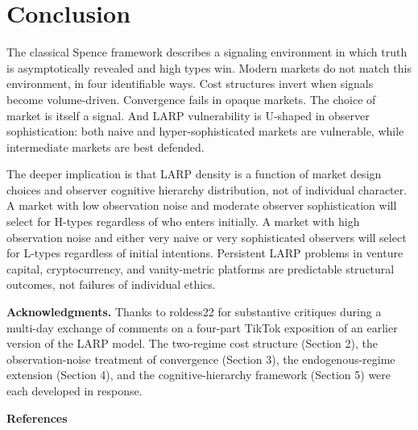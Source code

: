 \documentclass[11pt]{article}
\begin{document}
\section{Conclusion}

The classical Spence framework describes a signaling environment in which truth is asymptotically revealed and high types win. Modern markets do not match this environment, in four identifiable ways. Cost structures invert when signals become volume-driven. Convergence fails in opaque markets. The choice of market is itself a signal. And LARP vulnerability is U-shaped in observer sophistication: both naive and hyper-sophisticated markets are vulnerable, while intermediate markets are best defended.

The deeper implication is that LARP density is a function of market design choices and observer cognitive hierarchy distribution, not of individual character. A market with low observation noise and moderate observer sophistication will select for H-types regardless of who enters initially. A market with high observation noise and either very naive or very sophisticated observers will select for L-types regardless of initial intentions. Persistent LARP problems in venture capital, cryptocurrency, and vanity-metric platforms are predictable structural outcomes, not failures of individual ethics.

\vspace{0.5cm}
\noindent\textbf{Acknowledgments.} Thanks to roldess22 for substantive critiques during a multi-day exchange of comments on a four-part TikTok exposition of an earlier version of the LARP model. The two-regime cost structure (Section 2), the observation-noise treatment of convergence (Section 3), the endogenous-regime extension (Section 4), and the cognitive-hierarchy framework (Section 5) were each developed in response.

\vspace{0.5cm}
\noindent\textbf{References}
\end{document}
